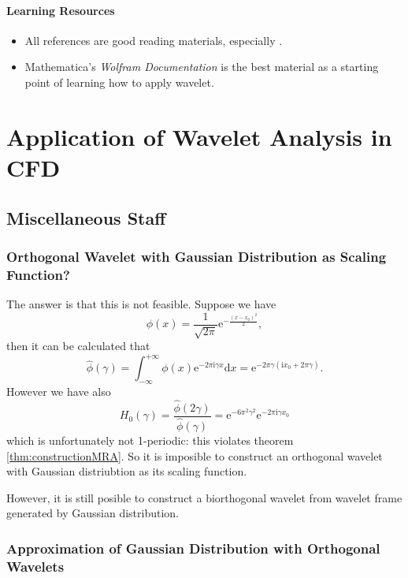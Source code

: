 \documentclass{book}
\newcommand{\mathd}{\mathrm{d}}
\newcommand{\mathe}{\mathrm{e}}
\newcommand{\mathi}{\mathrm{i}}
\newcommand{\mathpi}{\pi}
\newcommand{\tmtextit}[1]{{\itshape{#1}}}
\begin{document}
\subsection{Learning Resources}

\begin{itemize}
  \item All references are good reading materials, especially
  {\cite{daubechies1992ten}}.
  
  \item Mathematica's \tmtextit{Wolfram Documentation} is the best material as
  a starting point of learning how to apply wavelet.
\end{itemize}

\part{Application of Wavelet Analysis in CFD}

\chapter{Miscellaneous Staff}

\section{Orthogonal Wavelet with Gaussian Distribution as Scaling Function?}

The answer is that this is not feasible. Suppose we have
\[ \phi (x) = \frac{1}{\sqrt{2 \mathpi}} \mathe^{- \frac{(x - x_0)^2}{2}}, \]
then it can be calculated that
\[ \hat{\phi} (\gamma) = \int_{- \infty}^{+ \infty} \phi (x) \mathe^{- 2
   \mathpi \mathi \gamma x} \mathd x = \mathe^{- 2 \mathpi \gamma (\mathi x_0
   + 2 \mathpi \gamma)} . \]
However we have also
\[ H_0 (\gamma) = \frac{\hat{\phi} (2 \gamma)}{\hat{\phi} (\gamma)} =
   \mathe^{- 6 \mathpi^2 \gamma^2} \mathe^{- 2 \mathpi \mathi \gamma x_0} \]
which is unfortunately not 1-periodic: this violates theorem
\ref{thm:constructionMRA}. So it is imposible to construct an orthogonal
wavelet with Gaussian distriubtion as its scaling function.

However, it is still posible to construct a biorthogonal wavelet from wavelet
frame generated by Gaussian distribution.

\section{Approximation of Gaussian Distribution with Orthogonal Wavelets}
\end{document}

